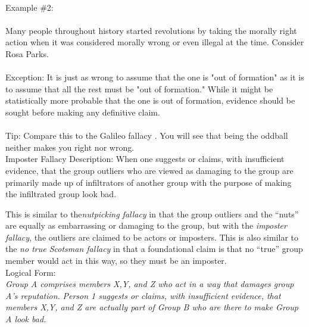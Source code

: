 \documentclass[a4paper,12pt,single,pdftex]{scrartcl}
\begin{document}
    
      
    \\

    
      Example \#2:
    \\

    
      
    \\

    
      Many people throughout history started revolutions by taking the morally right action when it was considered morally wrong or even illegal at the time. Consider Rosa Parks.
    \\

    
      
    \\

    
      Exception: It is just as wrong to assume that the one is "out of formation" as it is to assume that all the rest must be "out of formation." While it might be statistically more probable that the one is out of formation, evidence should be sought before making any definitive claim.
    \\

    
      
    \\

    
      Tip: Compare this to the Galileo fallacy . You will see that being the oddball neither makes you right nor wrong.
    \\

  

Imposter Fallacy
    Description: When one suggests or claims, with insufficient evidence, that the group outliers who are viewed as damaging to the group are primarily made up of infiltrators of another group with the purpose of making the infiltrated group look bad.

    
      This is similar to the{\em  {\it nutpicking fallacy} }in that the group outliers and the “nuts” are equally as embarrassing or damaging to the group, but with the {\em imposter fallacy}, the outliers are claimed to be actors or imposters. This is also similar to the {\em no true Scotsman fallacy} in that a foundational claim is that no “true” group member would act in this way, so they must be an imposter.
    \\

    
      Logical Form:
    \\

    
      {\em Group A comprises members X,Y, and Z who act in a way that damages group A’s reputation.} \newline
{\em Person 1 suggests or claims, with insufficient evidence, that members X,Y, and Z are actually part of Group B who are there to make Group A look bad.}
    \\
\end{document}
